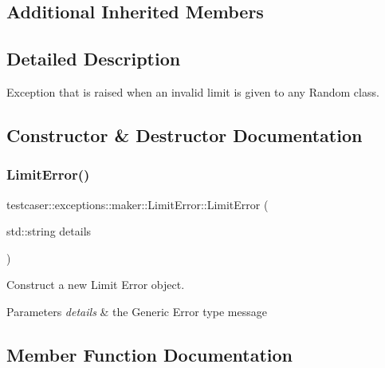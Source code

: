 \subsection*{Additional Inherited Members}


\subsection{Detailed Description}
Exception that is raised when an invalid limit is given to any Random class. 



\subsection{Constructor \& Destructor Documentation}
\mbox{\label{classtestcaser_1_1exceptions_1_1maker_1_1LimitError_a93442165f498e8910b4c2170a05d3b3a}} 
\subsubsection{\texorpdfstring{LimitError()}{LimitError()}}
{\footnotesize\ttfamily testcaser\+::exceptions\+::maker\+::\+Limit\+Error\+::\+Limit\+Error (\begin{DoxyParamCaption}\item[{std\+::string}]{details }\end{DoxyParamCaption})\hspace{0.3cm}{\ttfamily [inline]}}



Construct a new Limit Error object. 


\begin{DoxyParams}{Parameters}
{\em details} & the Generic Error type message \\
\hline
\end{DoxyParams}


\subsection{Member Function Documentation}
\mbox{\label{classtestcaser_1_1exceptions_1_1maker_1_1LimitError_adb0f0c92f0d78b26f4310301f97bff3a}} 
